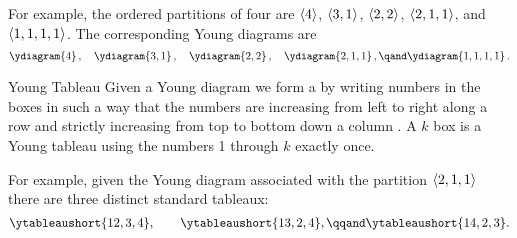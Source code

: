 \documentclass[fleqn]{NotesClass}
\DeclarePairedDelimiter{\tuple}{\langle}{\rangle}
\begin{document}
    For example, the ordered partitions of four are \(\tuple{4}\), \(\tuple{3,1}\), \(\tuple{2,2}\), \(\tuple{2,1,1}\), and \(\tuple{1,1,1,1}\).
    The corresponding Young diagrams are
    \begin{equation}
        \ydiagram{4}\,, \quad \ydiagram{3,1}\,, \quad \ydiagram{2,2}\,, \quad \ydiagram{2,1,1}\,, \qand \ydiagram{1,1,1,1}\,.
    \end{equation}
    
    \begin{dfn}{Young Tableau}{}
        Given a Young diagram we form a  by writing numbers in the boxes in such a way that the numbers are increasing from left to right along a row and strictly increasing from top to bottom down a column \cite{cvitanovic}.
        A \(k\) box  is a Young tableau using the numbers 1 through \(k\) exactly once.
    \end{dfn}
    
    For example, given the Young diagram associated with the partition \(\tuple{2,1,1}\) there are three distinct standard tableaux:
    \begin{equation}
        \ytableaushort{12,3,4}, \qquad \ytableaushort{13,2,4}, \qqand \ytableaushort{14,2,3}.
    \end{equation}
        
\end{document}
